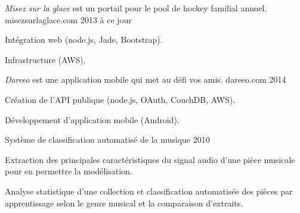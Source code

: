 
\begin{cventries}

  \cventry
    {\textit{Misez sur la glace} est un portail pour le pool de hockey familial annuel.} %
    {misezsurlaglace.com} %
    {} %
    {2013 à ce jour} %
    {
      \begin{cvitems} %
        \item {Intégration web (node.js, Jade, Bootstrap).}
        \item {Infrastructure (AWS).}
      \end{cvitems}
    }

  \cventry
    {\textit{Dareeo} est une application mobile qui met au défi vos amis.} %
    {dareeo.com} %
    {} %
    {2014} %
    {
      \begin{cvitems} %
        \item {Création de l’API publique (node.js, OAuth, CouchDB, AWS).}
        \item {Développement d’application mobile (Android).}
      \end{cvitems}
    }

  \cventry
    {} %
    {Système de classification automatisé de la musique} %
    {} %
    {2010} %
    {
      \begin{cvitems} %
        \item {Extraction des principales caractéristiques du signal audio d'une pièce musicale pour en permettre la modélisation.}
        \item {Analyse statistique d'une collection et classification automatisée des pièces par apprentissage selon le genre musical et la comparaison d'extraits.}
      \end{cvitems}
    }

\end{cventries}